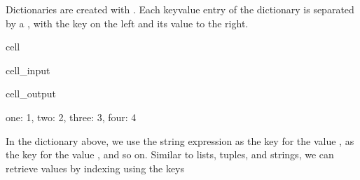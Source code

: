 \documentclass[letterpaper,10pt,english]{jupyterBook}
\begin{document}
\sphinxAtStartPar
Dictionaries are created with \sphinxcode{\sphinxupquote{\{\}}}.
Each key\sphinxhyphen{}value entry of the dictionary is separated by a \sphinxcode{\sphinxupquote{:}}, with the key on the left and its value to the right.

\begin{sphinxuseclass}{cell}\begin{sphinxVerbatimInput}

\begin{sphinxuseclass}{cell_input}
\begin{sphinxVerbatim}[commandchars=\\\{\}]
       
\end{sphinxVerbatim}

\end{sphinxuseclass}\end{sphinxVerbatimInput}
\begin{sphinxVerbatimOutput}

\begin{sphinxuseclass}{cell_output}
\begin{sphinxVerbatim}[commandchars=\\\{\}]
\PYGZob{}\PYGZsq{}one\PYGZsq{}: 1, \PYGZsq{}two\PYGZsq{}: 2, \PYGZsq{}three\PYGZsq{}: 3, \PYGZsq{}four\PYGZsq{}: 4\PYGZcb{}
\end{sphinxVerbatim}

\end{sphinxuseclass}\end{sphinxVerbatimOutput}

\end{sphinxuseclass}
\sphinxAtStartPar
In the dictionary above, we use the string expression  as the key for the value ,  as the key for the value , and so on. Similar to lists, tuples, and strings, we can retrieve values by indexing using the keys
\end{document}
